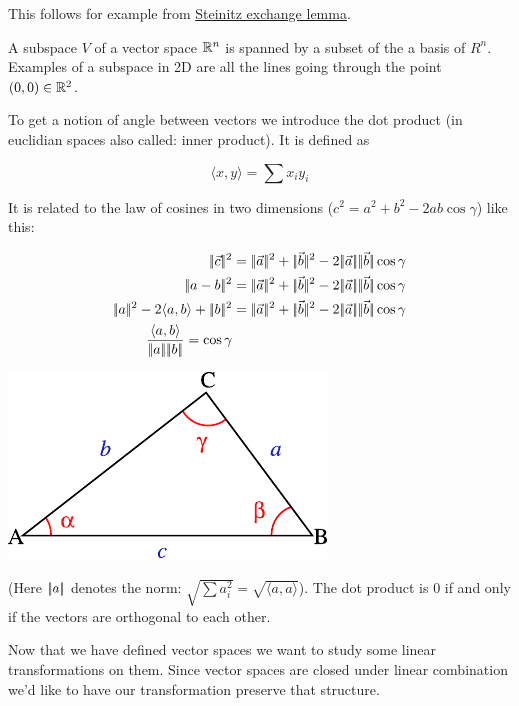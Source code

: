 This follows for example from \href{http://en.wikipedia.org/wiki/Steinitz_exchange_lemma}{Steinitz exchange lemma}.

\begin{Def}[Subspace]
 A subspace $V$ of a vector space $\mathbb{R}^n$ is spanned by a subset of the a basis of $R^n$. Examples of a subspace in 2D are all the lines going through the point $(0,0) \in \mathbb{R}^2$.
\end{Def}

To get a notion of angle between vectors we introduce the dot product (in euclidian spaces also called: inner product). It is defined as

\[\langle x,y\rangle  = \sum x_iy_i\]

It is related to the law of cosines in two dimensions ($c^2 = a^2+b^2-2ab\cos \gamma$) like this:

\begin{minipage}[hbt]{0.5\linewidth}
\begin{align*}
\norm{\vec c}^2 &= \norm{\vec a}^2 + \norm{\vec b}^2 -2\norm{\vec a}\norm{\vec b}\cos \gamma\\
\norm{a-b}^2 &= \norm{\vec a}^2 + \norm{\vec b}^2 -2\norm{\vec a}\norm{\vec b}\cos \gamma\\
\norm{a}^2-2\langle a,b\rangle +\norm{b}^2 &= \norm{\vec a}^2 + \norm{\vec b}^2 -2\norm{\vec a}\norm{\vec b}\cos \gamma\\
\frac{\langle a,b\rangle }{\norm{a}\norm{b}} = \cos \gamma
\end{align*}
\end{minipage}
\hfill
\begin{minipage}[hbt]{0.3\linewidth}
\includegraphics[scale=0.8]{./images/Triangle_with_notations_2.pdf}
\end{minipage}

\bigskip
(Here $|\!|a|\!|$ denotes the norm: $\sqrt{\sum a_i^2} = \sqrt{\langle a,a\rangle }$). The dot product is $0$ if and only if the vectors are orthogonal to each other.

Now that we have defined vector spaces we want to study some linear transformations on them. Since vector spaces are closed under linear combination we'd like to have our transformation preserve that structure.

